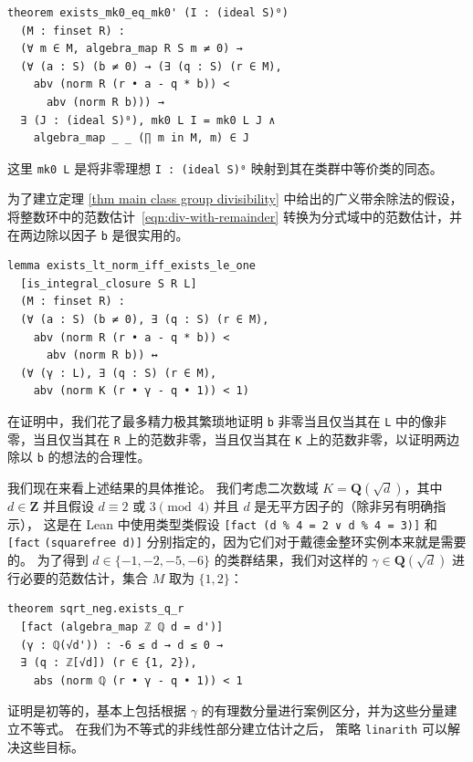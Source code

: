 \documentclass[sigplan,10pt,nonacm,
screen]{acmart} \settopmatter{printfolios=true,printccs=false,printacmref=false}
\newcommand{\QQ}{\mathbf{Q}}
\newcommand{\ZZ}{\mathbf{Z}}
\begin{document}
\begin{lstlisting}
theorem exists_mk0_eq_mk0' (I : (ideal S)⁰)
  (M : finset R) :
  (∀ m ∈ M, algebra_map R S m ≠ 0) →
  (∀ (a : S) (b ≠ 0) → (∃ (q : S) (r ∈ M),
    abv (norm R (r • a - q * b)) <
      abv (norm R b))) →
  ∃ (J : (ideal S)⁰), mk0 L I = mk0 L J ∧
    algebra_map _ _ (∏ m in M, m) ∈ J
\end{lstlisting}
这里 \lstinline{mk0 L} 是将非零理想 \lstinline{I : (ideal S)⁰} 映射到其在类群中等价类的同态。

为了建立定理 \ref{thm main class group divisibility} 中给出的广义带余除法的假设，
将整数环中的范数估计~\eqref{eqn:div-with-remainder} 转换为分式域中的范数估计，并在两边除以因子 \lstinline{b} 是很实用的。
\begin{lstlisting}
lemma exists_lt_norm_iff_exists_le_one
  [is_integral_closure S R L]
  (M : finset R) :
  (∀ (a : S) (b ≠ 0), ∃ (q : S) (r ∈ M),
    abv (norm R (r • a - q * b)) <
      abv (norm R b)) ↔
  (∀ (γ : L), ∃ (q : S) (r ∈ M),
    abv (norm K (r • γ - q • 1)) < 1)
\end{lstlisting}
在证明中，我们花了最多精力极其繁琐地证明 \lstinline{b} 非零当且仅当其在 \lstinline{L} 中的像非零，当且仅当其在 \lstinline{R} 上的范数非零，当且仅当其在 \lstinline{K} 上的范数非零，以证明两边除以 \lstinline{b} 的想法的合理性。

我们现在来看上述结果的具体推论。
我们考虑二次数域 $K=\QQ(\sqrt{d})$，其中 $d \in \ZZ$ 并且假设 $d\equiv 2 \text{ 或 } 3 \pmod{4}$ 并且 $d$ 是无平方因子的（除非另有明确指示），
这是在 Lean 中使用类型类假设 \lstinline{[fact (d % 4 = 2 ∨ d % 4 = 3)]} 和 \lstinline{[fact} \lstinline{(square}\-\lstinline{free d)]} 分别指定的，因为它们对于戴德金整环实例本来就是需要的。
为了得到 $d \in \{-1,-2,-5,-6 \}$ 的类群结果，我们对这样的 $\gamma \in \QQ(\sqrt{d})$ 进行必要的范数估计，集合 $M$ 取为 $\{1,2\}$：

\begin{lstlisting}
theorem sqrt_neg.exists_q_r
  [fact (algebra_map ℤ ℚ d = d')]
  (γ : ℚ(√d')) : -6 ≤ d → d ≤ 0 →
  ∃ (q : ℤ[√d]) (r ∈ {1, 2}),
    abs (norm ℚ (r • γ - q • 1)) < 1
\end{lstlisting}

证明是初等的，基本上包括根据 $\gamma$ 的有理数分量进行案例区分，并为这些分量建立不等式。
在我们为不等式的非线性部分建立估计之后，
策略 \lstinline{linarith} 可以解决这些目标。
\end{document}

